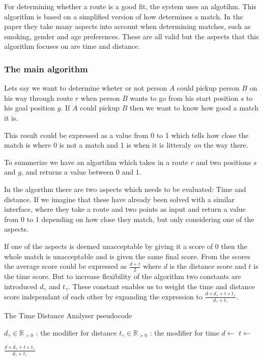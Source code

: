 For determining whether a route is a good fit, the system uses an algotihm.
This algorithm is based on a simplified version of how \citet{ghoseiri2011real} determines a match.
In the paper they take many aspects into account when determining matches, such as smoking, gender and age preferences.
These are all valid but the aspects that this algorithm focuses on are time and distance.

\subsubsection{The main algorithm}
Lets say we want to determine wheter or not person $A$ could pickup person $B$ on his way through route $r$ when person $B$ wants to go from his start position $s$ to his goal position $g$.
If $A$ could pickup $B$ then we want to know how good a match it is.

This result could be expressed as a value from 0 to 1 which tells how close the match is where 0 is not a match and 1 is when it is litteraly \emph{on} the way there.

To summerize we have an algortihm which takes in a route $r$ and two positions $s$ and $g$, and returns a value between 0 and 1.

In the algorthm there are two aspects which needs to be evaluated: Time and distance.
If we imagine that these have already been solved with a similar interface, where they take a route and two points as input and return a value from 0 to 1 depending on how close they match, but only considering one of the aspects.

If one of the aspects is deemed unacceptable by giving it a score of 0 then the whole match is unacceptable and is given the same final score.
From the scores the average score could be expressed as $\frac{d+t}{2}$ where $d$ is the distance score and $t$ is the time score.
But to increase flexibility of the algorithm two constants are introduced $d_\gamma$ and $t_\gamma$.
These constant enables us to weight the time and distance score independant of each other by expanding the expression to $\frac{d\times d_\gamma+t\times t_\gamma}{d_\gamma+t_\gamma}$.

\begin{algorithm}
	\caption{The Time Distance Analyser pseudocode}
	\label{alg:timedistanalyser}
	\begin{algorithmic}[1]
		\Require 
		\Statex $d_\gamma\in \mathbb{R}_{>0}$ : the modifier for distance
		\Statex $t_\gamma\in\mathbb{R}_{>0}$ : the modifier for time
		\Statex 
			\State $d\gets$
			\State $t\gets$
			
				\State \Return $\frac{d\times d_\gamma+t\times t_\gamma}{d_\gamma+t_\gamma}$
			\Else
				\State{}
			\EndIf
		\EndFunction
	\end{algorithmic}
\end{algorithm}

